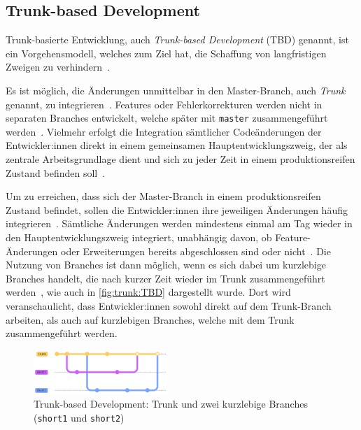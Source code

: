 
\subsection{Trunk-based Development}
\label{sec:workflows:trunk} 

Trunk-basierte Entwicklung, auch \emph{Trunk-based Development} (TBD) genannt, ist ein Vorgehensmodell, welches zum Ziel hat, die Schaffung von langfristigen Zweigen zu verhindern~\cite{trunkbased6}.

Es ist möglich, die Änderungen unmittelbar in den Master-Branch, auch \emph{Trunk} genannt, zu integrieren~\cite{trunkbased2}. Features oder Fehlerkorrekturen werden nicht in separaten Branches entwickelt, welche später mit \texttt{master} zusammengeführt werden~\cite{trunkbased2}. Vielmehr erfolgt die Integration sämtlicher Codeänderungen der Entwickler:innen direkt in einem gemeinsamen Hauptentwicklungszweig, der als zentrale Arbeitsgrundlage dient und sich zu jeder Zeit in einem produktionsreifen Zustand befinden soll~\cite{trunkbased1}.

Um zu erreichen, dass sich der Master-Branch in einem produktionsreifen Zustand befindet, sollen die Entwickler:innen ihre jeweiligen Änderungen häufig integrieren~\cite{trunkbased2}. Sämtliche Änderungen werden mindestens einmal am Tag wieder in den Hauptentwicklungszweig integriert, unabhängig davon, ob Feature\hyp Änderungen oder Erweiterungen bereits abgeschlossen sind oder nicht~\cite{trunkbased3}. Die Nutzung von Branches ist dann möglich, wenn es sich dabei um kurzlebige Branches handelt, die nach kurzer Zeit wieder im Trunk zusammengeführt werden~\cite{trunkbased7}, wie auch in \autoref{fig:trunk:TBD} dargestellt wurde. Dort wird veranschaulicht, dass Entwickler:innen sowohl direkt auf dem Trunk\hyp Branch arbeiten, als auch auf kurzlebigen Branches, welche mit dem Trunk zusammengeführt werden.


\begin{figure}
    \includegraphics[width=0.45\textwidth]{src/assets/diagrams/trunk/trunk.pdf}
    \caption{Trunk-based Development: Trunk und zwei kurzlebige Branches (\texttt{short1} und \texttt{short2})}
    \label{fig:trunk:TBD}
\end{figure}

